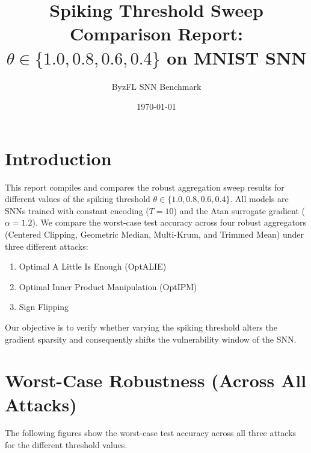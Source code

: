 \documentclass{article}
\title{Spiking Threshold Sweep Comparison Report:\\$\theta \in \{1.0, 0.8, 0.6, 0.4\}$ on MNIST SNN}
\author{ByzFL SNN Benchmark}
\date{\today}
\begin{document}
\maketitle

\clearpage
\tableofcontents
\clearpage

\section{Introduction}
This report compiles and compares the robust aggregation sweep results for different values of the spiking threshold $\theta \in \{1.0, 0.8, 0.6, 0.4\}$. All models are SNNs trained with constant encoding ($T=10$) and the Atan surrogate gradient ($\alpha = 1.2$).
We compare the worst-case test accuracy across four robust aggregators (Centered Clipping, Geometric Median, Multi-Krum, and Trimmed Mean) under three different attacks:
\begin{enumerate}
    \item Optimal A Little Is Enough (OptALIE)
    \item Optimal Inner Product Manipulation (OptIPM)
    \item Sign Flipping
\end{enumerate}
Our objective is to verify whether varying the spiking threshold alters the gradient sparsity and consequently shifts the vulnerability window of the SNN.

\clearpage
\section{Worst-Case Robustness (Across All Attacks)}
The following figures show the worst-case test accuracy across all three attacks for the different threshold values.
\end{document}
